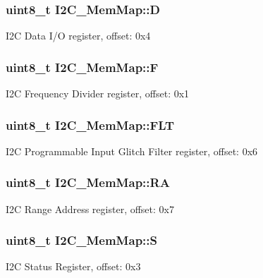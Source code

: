 \subsubsection[{D}]{\setlength{\rightskip}{0pt plus 5cm}uint8\+\_\+t I2\+C\+\_\+\+Mem\+Map\+::\+D}\label{struct_i2_c___mem_map_a44f0a2e82a172b16e1241939185790cf}
I2\+C Data I/\+O register, offset\+: 0x4 \hypertarget{struct_i2_c___mem_map_a9f07a2e505dda38873798958a6c9f432}{}
\subsubsection[{F}]{\setlength{\rightskip}{0pt plus 5cm}uint8\+\_\+t I2\+C\+\_\+\+Mem\+Map\+::\+F}\label{struct_i2_c___mem_map_a9f07a2e505dda38873798958a6c9f432}
I2\+C Frequency Divider register, offset\+: 0x1 \hypertarget{struct_i2_c___mem_map_a6520708827670dc2938e6cdec0264763}{}
\subsubsection[{F\+L\+T}]{\setlength{\rightskip}{0pt plus 5cm}uint8\+\_\+t I2\+C\+\_\+\+Mem\+Map\+::\+F\+L\+T}\label{struct_i2_c___mem_map_a6520708827670dc2938e6cdec0264763}
I2\+C Programmable Input Glitch Filter register, offset\+: 0x6 \hypertarget{struct_i2_c___mem_map_a9f17398ec3278c30924dd797dea9788a}{}
\subsubsection[{R\+A}]{\setlength{\rightskip}{0pt plus 5cm}uint8\+\_\+t I2\+C\+\_\+\+Mem\+Map\+::\+R\+A}\label{struct_i2_c___mem_map_a9f17398ec3278c30924dd797dea9788a}
I2\+C Range Address register, offset\+: 0x7 \hypertarget{struct_i2_c___mem_map_acba6223219d3887b1ba085cf199bf84a}{}
\subsubsection[{S}]{\setlength{\rightskip}{0pt plus 5cm}uint8\+\_\+t I2\+C\+\_\+\+Mem\+Map\+::\+S}\label{struct_i2_c___mem_map_acba6223219d3887b1ba085cf199bf84a}
I2\+C Status Register, offset\+: 0x3 \hypertarget{struct_i2_c___mem_map_aac56d4be80ad622d7bf85bdd8c29504c}{}
